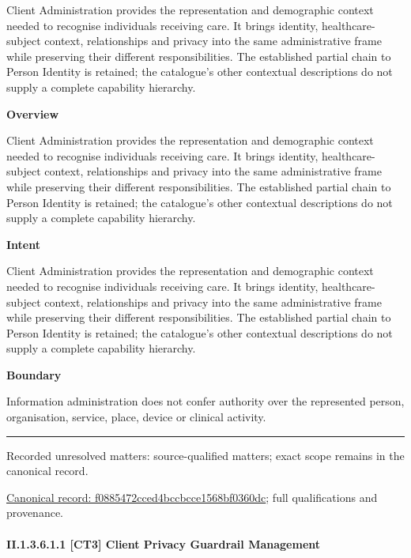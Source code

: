 Client Administration provides the representation and demographic context needed to recognise individuals receiving care. It brings identity, healthcare-subject context, relationships and privacy into the same administrative frame while preserving their different responsibilities. The established partial chain to Person Identity is retained; the catalogue's other contextual descriptions do not supply a complete capability hierarchy.



\textbf{Overview}



Client Administration provides the representation and demographic context needed to recognise individuals receiving care. It brings identity, healthcare-subject context, relationships and privacy into the same administrative frame while preserving their different responsibilities. The established partial chain to Person Identity is retained; the catalogue's other contextual descriptions do not supply a complete capability hierarchy.



\textbf{Intent}



Client Administration provides the representation and demographic context needed to recognise individuals receiving care. It brings identity, healthcare-subject context, relationships and privacy into the same administrative frame while preserving their different responsibilities. The established partial chain to Person Identity is retained; the catalogue's other contextual descriptions do not supply a complete capability hierarchy.



\textbf{Boundary}



Information administration does not confer authority over the represented person, organisation, service, place, device or clinical activity.



\medskip\hrule\medskip

{\small Recorded unresolved matters: source-qualified matters; exact scope remains in the canonical record.}\par
{\footnotesize \href{../../../../continuum/strategy/capability/f0885472cced4bccbcce1568bf0360dc.md}{Canonical record: f0885472cced4bccbcce1568bf0360dc}; full qualifications and provenance.}\par
\paragraph*{II.1.3.6.1.1 [CT3] Client Privacy Guardrail Management}
\label{navigation:II.1.3.6.1.1}

